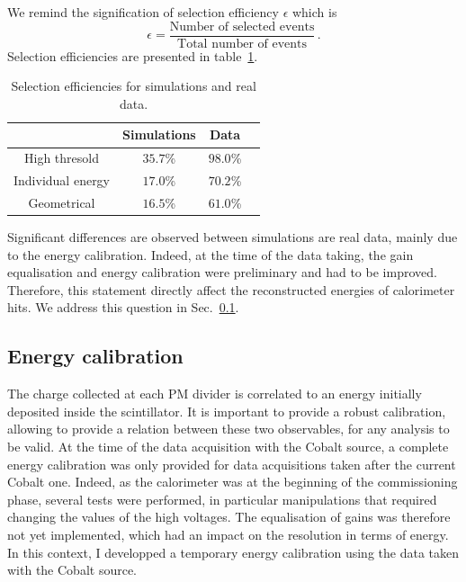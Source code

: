 We remind the signification of selection efficiency $\epsilon$ which is
\begin{equation}
  \epsilon = \frac{\text{Number of selected events}}{\text{Total number of events}}\,.
\end{equation}
Selection efficiencies are presented in table~\ref{tab:Co_cut_eff}.
\begin{table}[h]
  \centering
  \begin{tabular}{|c|c|c|c|}
    \hline
    & Simulations & Data \\
    \hline\hline
    High thresold & $35.7$\% & $98.0$\% \\
    Individual energy & $17.0$\% & $70.2$\% \\
    Geometrical & $16.5$\% & $61.0$\% \\
    \hline
  \end{tabular}
  \caption{Selection efficiencies for simulations and real data.
    \label{tab:Co_cut_eff}}
\end{table}
Significant differences are observed between simulations are real data, mainly due to the energy calibration.
Indeed, at the time of the data taking, the gain equalisation and energy calibration were preliminary and had to be improved.
Therefore, this statement directly affect the reconstructed energies of calorimeter hits.
We address this question in Sec.~\ref{subsec:Co_energy_calib}.



\subsection{Energy calibration}
\label{subsec:Co_energy_calib}

The charge collected at each PM divider is correlated to an energy initially deposited inside the scintillator.
It is important to provide a robust calibration, allowing to provide a relation between these two observables, for any analysis to be valid.
At the time of the data acquisition with the Cobalt source, a complete energy calibration was only provided for data acquisitions taken after the current Cobalt one.
Indeed, as the calorimeter was at the beginning of the commissioning phase, several tests were performed, in particular manipulations that required changing the values of the high voltages.
The equalisation of gains was therefore not yet implemented, which had an impact on the resolution in terms of energy.
In this context, I developped a temporary energy calibration using the data taken with the Cobalt source.

